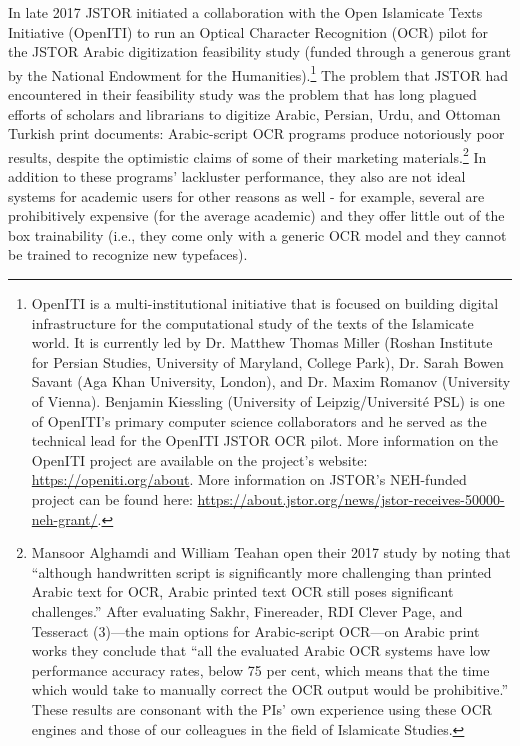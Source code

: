 In late 2017 JSTOR initiated a collaboration with the Open Islamicate Texts
Initiative (OpenITI) to run an Optical Character Recognition (OCR) pilot for
the JSTOR Arabic digitization feasibility study (funded through a generous
grant by the National Endowment for the Humanities).\footnote{OpenITI is a
multi-institutional initiative that is focused on building digital
infrastructure for the computational study of the texts of the Islamicate
world. It is currently led by Dr. Matthew Thomas Miller (Roshan Institute for
Persian Studies, University of Maryland, College Park), Dr. Sarah Bowen Savant
(Aga Khan University, London), and Dr. Maxim Romanov (University of Vienna).
Benjamin Kiessling (University of Leipzig/Université PSL) is one of OpenITI’s
primary computer science collaborators and he served as the technical lead for
the OpenITI JSTOR OCR pilot.  More information on the OpenITI project are
available on the project’s website: \url{https://openiti.org/about}. More
information on JSTOR’s NEH-funded project can be found here:
\url{https://about.jstor.org/news/jstor-receives-50000-neh-grant/}.}
 The problem that JSTOR had encountered in their feasibility study was the
problem that has long plagued efforts of scholars and librarians to digitize
Arabic, Persian, Urdu, and Ottoman Turkish print documents: Arabic-script OCR
programs produce notoriously poor results, despite the optimistic claims of
some of their marketing materials\cite{alghamdi2017experimental}.\footnote{Mansoor
Alghamdi and William Teahan open their 2017 study by noting that “although
handwritten script is significantly more challenging than printed Arabic text
for OCR, Arabic printed text OCR still poses significant challenges.” After
evaluating Sakhr, Finereader, RDI Clever Page, and Tesseract (3)—the main
options for Arabic-script OCR—on Arabic print works they conclude that “all the
evaluated Arabic OCR systems have low performance accuracy rates, below 75 per
cent, which means that the time which would take to manually correct the OCR
output would be prohibitive.” These results are consonant with the PIs’ own
experience using these OCR engines and those of our colleagues in the field of
Islamicate Studies.}
 In addition to these programs’ lackluster performance, they also are not ideal
systems for academic users for other reasons as well - for example, several are
prohibitively expensive (for the average academic) and they offer little out of
the box trainability (i.e., they come only with a generic OCR model and they
cannot be trained to recognize new typefaces).

